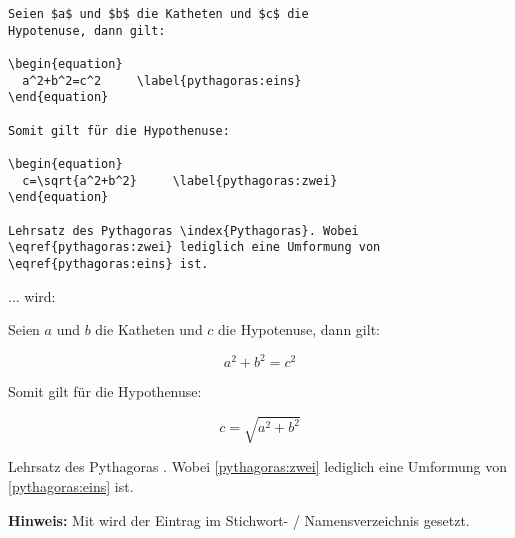 \begin{tcolorbox}[width=\textwidth,colback={light-gray},title={Latex-Text},colbacktitle=gray,coltitle=white]

\begin{verbatim}
Seien $a$ und $b$ die Katheten und $c$ die
Hypotenuse, dann gilt: 

\begin{equation}
  a^2+b^2=c^2     \label{pythagoras:eins}
\end{equation}
 
Somit gilt für die Hypothenuse: 

\begin{equation}
  c=\sqrt{a^2+b^2}     \label{pythagoras:zwei}
\end{equation}

Lehrsatz des Pythagoras \index{Pythagoras}. Wobei 
\eqref{pythagoras:zwei} lediglich eine Umformung von 
\eqref{pythagoras:eins} ist.
\end{verbatim}

\end{tcolorbox}

... wird:

\begin{tcolorbox}[width=\textwidth,colback={light-gray},title={Print-Text},colbacktitle=gray,coltitle=white]

Seien $a$ und $b$ die Katheten und $c$ die
Hypotenuse, dann gilt: 

\begin{equation}
  a^2+b^2=c^2     \label{pythagoras:eins}
\end{equation}
 
Somit gilt für die Hypothenuse: 

\begin{equation}
  c=\sqrt{a^2+b^2}     \label{pythagoras:zwei}
\end{equation}

Lehrsatz des Pythagoras . Wobei 
\eqref{pythagoras:zwei} lediglich eine Umformung von 
\eqref{pythagoras:eins} ist.

\end{tcolorbox}


\textbf{Hinweis:} Mit wird der Eintrag im Stichwort- / Namensverzeichnis gesetzt.
